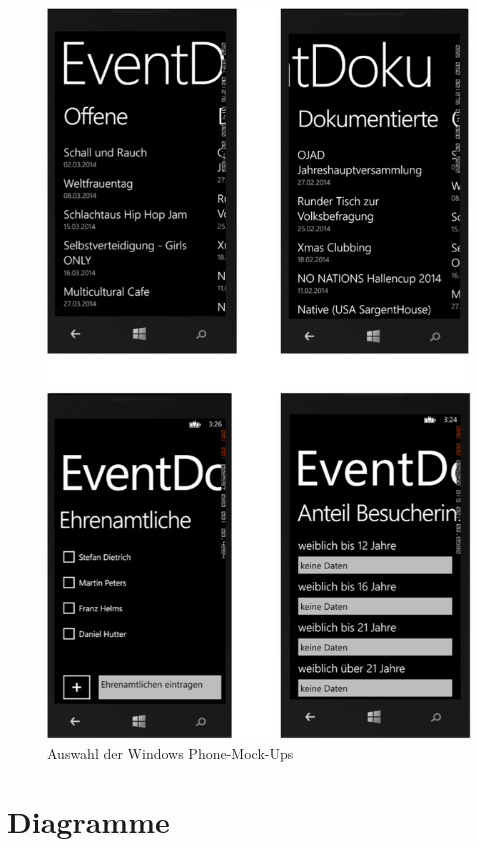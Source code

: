 \documentclass[Bachelorarbeit.tex]{subfiles}
\begin{document}
\begin{figure}
\centering
\includegraphics[width=0.9\linewidth]{./img/Auswahl_WP_Mockups}
\caption{Auswahl der Windows Phone-Mock-Ups}
\label{fig:Auswahl_WP_Mockups}
\end{figure}

\newpage

\chapter*{Diagramme}
\label{sec:uml_diagramme}
\end{document}
